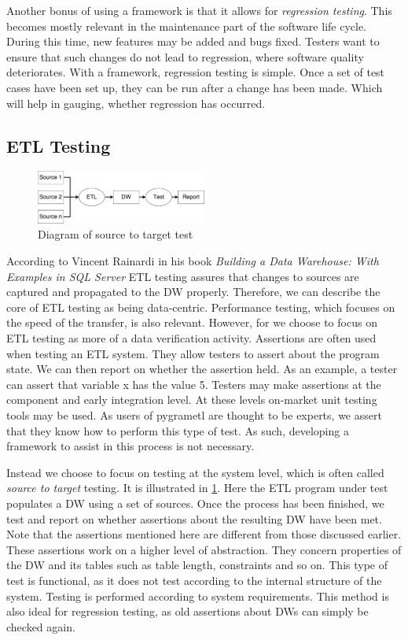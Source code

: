 Another bonus of using a framework is that it allows for \emph{regression testing}. This becomes mostly relevant in the maintenance part of the software life cycle. During this time, new features may be added and bugs fixed. Testers want to ensure that such changes do not lead to regression, where software quality deteriorates. With a framework, regression testing is simple. Once a set of test cases have been set up, they can be run after a change has been made. Which will help in gauging, whether regression has occurred.

\subsection{ETL Testing}

\begin{figure}
\centering
\includegraphics[width=0.5\textwidth]{figures/scenario.pdf}
\caption{Diagram of source to target test}
\label{fig:sourcetotarget}
\end{figure}

According to Vincent Rainardi in his book \textit{Building a Data Warehouse: With Examples in SQL Server}\cite{rainardi2007building} ETL testing assures that changes to sources are captured and propagated to the DW properly. Therefore, we can describe the core of ETL testing as being data-centric. Performance testing, which focuses on the speed of the transfer, is also relevant. However, for \FW{} we choose to focus on ETL testing as more of a data verification activity. Assertions are often used when testing an ETL system. They allow testers to assert about the program state. We can then report on whether the assertion held. As an example, a tester can assert that variable x has the value 5. Testers may make assertions at the component and early integration level. At these levels on-market unit testing tools may be used. As users of pygrametl are thought to be experts, we assert that they know how to perform this type of test. As such, developing a framework to assist in this process is not necessary.

Instead we choose to focus on testing at the system level, which is often called \emph{source to target} testing. It is illustrated in \cref{fig:sourcetotarget}. Here the ETL program under test populates a DW using a set of sources. Once the process has been finished, we test and report on whether assertions about the resulting DW have been met. Note that the assertions mentioned here are different from those discussed earlier. These assertions work on a higher level of abstraction. They concern properties of the DW and its tables such as table length, constraints and so on. This type of test is functional, as it does not test according to the internal structure of the system. Testing is performed according to system requirements. This method is also ideal for regression testing, as old assertions about DWs can simply be checked again.


